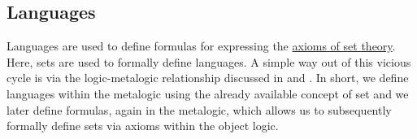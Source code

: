 \subsection{Languages}\label{subsec:languages}

\begin{remark}\label{rem:language_definitions_using_sets}
  Languages are used to define formulas for expressing the \hyperref[def:set]{axioms of set theory}. Here, sets are used to formally define languages. A simple way out of this vicious cycle is via the logic-metalogic relationship discussed in  and . In short, we define languages within the metalogic using the already available concept of set and we later define formulas, again in the metalogic, which allows us to subsequently formally define sets via axioms within the object logic.
\end{remark}

